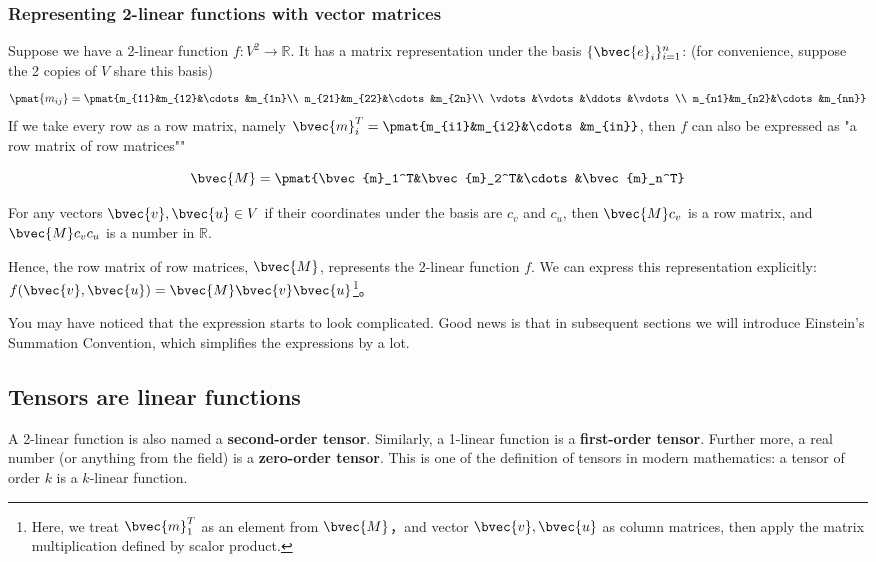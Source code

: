 \subsubsection{Representing 2-linear functions with vector matrices}

Suppose we have a 2-linear function $f:V^2\rightarrow\mathbb{R}$. It has a matrix representation under the basis $\{\bvec{e}_i\}_{i=1}^n$: (for convenience, suppose the 2 copies of $V$ share this basis)
\begin{equation}
\pmat{m_{ij}}=\pmat{m_{11}&m_{12}&\cdots&m_{1n}\\ m_{21}&m_{22}&\cdots&m_{2n}\\ \vdots&\vdots&\ddots&\vdots\\ m_{n1}&m_{n2}&\cdots&m_{nn}}
\end{equation}
If we take every row as a row matrix, namely $\bvec{m}_i^T=\pmat{m_{i1}&m_{i2}&\cdots&m_{in}}$, then $f$ can also be expressed as "a row matrix of row matrices"" 

\begin{equation}
\bvec{M}=\pmat{\bvec{m}_1^T&\bvec{m}_2^T&\cdots&\bvec{m}_n^T}
\end{equation}

For any vectors $\bvec{v}, \bvec{u}\in V$ if their coordinates under the basis are $c_v$ and $c_u$, then $\bvec{M}c_v$ is a row matrix, and $\bvec{M}c_vc_u$ is a number in $\mathbb{R}$. 

Hence, the row matrix of row matrices, $\bvec{M}$, represents the 2-linear function $f$. We can express this representation explicitly: $f(\bvec{v}, \bvec{u})=\bvec{M}\bvec{v}\bvec{u}$\footnote{Here, we treat $\bvec{m}_1^T$ as an element from $\bvec{M}$，and vector $\bvec{v}, \bvec{u}$ as column matrices, then apply the matrix multiplication defined by scalor product. }。

You may have noticed that the expression starts to look complicated. Good news is that in subsequent sections we will introduce Einstein's Summation Convention, which simplifies the expressions by a lot. 

\subsection{Tensors are linear functions}

A 2-linear function is also named a \textbf{second-order tensor}. Similarly, a 1-linear function is a \textbf{first-order tensor}. Further more, a real number (or anything from the field) is a \textbf{zero-order tensor}. This is one of the definition of tensors in modern mathematics: a tensor of order $k$ is a $k$-linear function. 

